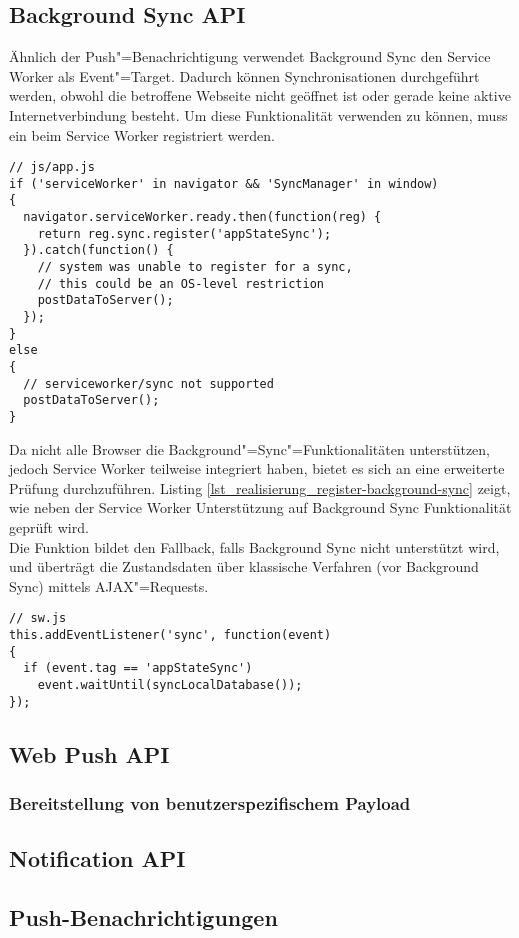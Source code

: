\newpage
\subsection{Background Sync API}
\label{subsec_implementierung_background-sync}

Ähnlich der Push"=Benachrichtigung verwendet Background Sync den Service Worker als Event"=Target. Dadurch können Synchronisationen durchgeführt werden, obwohl die betroffene Webseite nicht geöffnet ist oder gerade keine aktive Internetverbindung besteht. Um diese Funktionalität verwenden zu können, muss ein  beim Service Worker registriert werden. \\

\begin{lstlisting}[caption={Registrierung Background Sync},label={lst_realisierung_register-background-sync}, frame=single]
// js/app.js
if ('serviceWorker' in navigator && 'SyncManager' in window) 
{
  navigator.serviceWorker.ready.then(function(reg) {
    return reg.sync.register('appStateSync');
  }).catch(function() {
    // system was unable to register for a sync,
    // this could be an OS-level restriction
    postDataToServer();
  });
}
else 
{
  // serviceworker/sync not supported
  postDataToServer();
}
\end{lstlisting}

Da nicht alle Browser die Background"=Sync"=Funktionalitäten unterstützen, jedoch Service Worker teilweise integriert haben, bietet es sich an eine erweiterte Prüfung durchzuführen. Listing \ref{lst_realisierung_register-background-sync} zeigt, wie neben der Service Worker Unterstützung auf Background Sync Funktionalität geprüft wird. \\
Die Funktion  bildet den Fallback, falls Background Sync nicht unterstützt wird, und überträgt die Zustandsdaten über \glqq klassische\grqq{} Verfahren (vor Background Sync) mittels AJAX"=Requests.\\

\begin{lstlisting}[caption={\code{sync}"=EventListener in der Service Worker Konfigurationsdatei},label={lst_realisierung_sw-background-sync}, frame=single]
// sw.js
this.addEventListener('sync', function(event) 
{
  if (event.tag == 'appStateSync') 
    event.waitUntil(syncLocalDatabase());
});
\end{lstlisting}


 


\subsection{Web Push API}

\subsubsection{Bereitstellung von benutzerspezifischem Payload}

\subsection{Notification API}

\subsection{Push-Benachrichtigungen}



